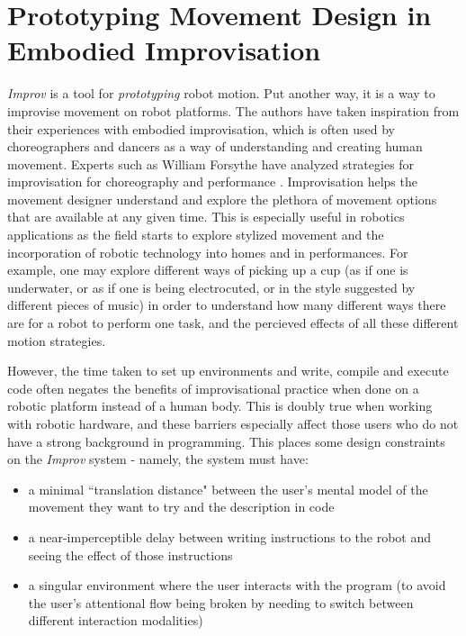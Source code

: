\documentclass[sigconf]{acmart}
\begin{document}
\section{Prototyping Movement Design in Embodied Improvisation}\label{embodied}

\emph{Improv} is a tool for \emph{prototyping} robot motion. Put another way, it
is a way to improvise movement on robot platforms. The authors have taken
inspiration from their experiences with embodied improvisation, which is often
used by choreographers and dancers as a way of understanding and creating human
movement. Experts such as William Forsythe have analyzed strategies for
improvisation for choreography and performance \cite{forsythe2004improvisation}.
Improvisation helps the movement designer understand and explore the plethora of
movement options that are available at any given time. This is especially useful
in robotics applications as the field starts to explore stylized movement and
the incorporation of robotic technology into homes and in performances. For
example, one may explore different ways of picking up a cup (as if one is
underwater, or as if one is being electrocuted, or in the style suggested by
different pieces of music) in order to understand how many different ways there
are for a robot to perform one task, and the percieved effects of all these
different motion strategies.

However, the time taken to set up environments and write, compile and
execute code often negates the benefits of improvisational practice when done
on a robotic platform instead of a human body. This is
doubly true when working with robotic hardware, and these barriers especially
affect those users who do not have a strong background in programming. This places
some design constraints on the \emph{Improv} system - namely, the system must
have:

\begin{itemize}
\item a minimal ``translation
distance" between the user's mental model of the movement they want to try and
the description in code
\item a near-imperceptible delay between writing instructions to the robot and
seeing the effect of those instructions
\item a singular environment where the
user interacts with the program (to avoid the user's attentional flow being
broken by needing to switch between different interaction modalities)
\end{itemize}
\end{document}
